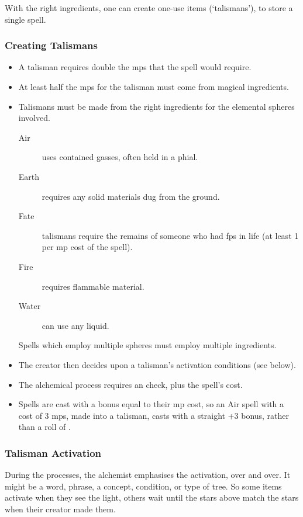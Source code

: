 \begin{multicols}{2}

\noindent
With the right ingredients, one can create one-use items (`talismans'), to store a single spell.

\subsubsection{Creating Talismans}

\begin{itemize}
  \item
  A talisman requires double the \glspl{mp} that the spell would require.
  \item
  At least half the \glspl{mp} for the talisman must come from magical ingredients.
  \item
  Talismans must be made from the right ingredients for the elemental spheres involved.
  \begin{description}
    \item[Air]
    uses contained gasses, often held in a phial.
    \item[Earth]
    requires any solid materials dug from the ground.
    \item[Fate]
    talismans require the remains of someone who had \glspl{fp} in life (at least 1 per \gls{mp} cost of the spell).
    \item[Fire]
    requires flammable material.
    \item[Water]
    can use any liquid.
  \end{description}
  Spells which employ multiple spheres must employ multiple ingredients.
  \item
  The creator then decides upon a talisman's activation conditions (see below).
  \item
  The alchemical process requires an  check, \tn[7] plus the spell's cost.
  \item
  Spells are cast with a bonus equal to their \gls{mp} cost, so an Air spell with a cost of 3 \glspl{mp}, made into a talisman, casts with a straight +3 bonus, rather than a roll of .
\end{itemize}

\subsubsection{Talisman Activation}

During the processes, the alchemist emphasises the activation, over and over.
It might be a word, phrase, a concept, condition, or type of tree.
So some items activate when they see the light, others wait until the stars above match the stars when their creator made them.


\end{multicols}
